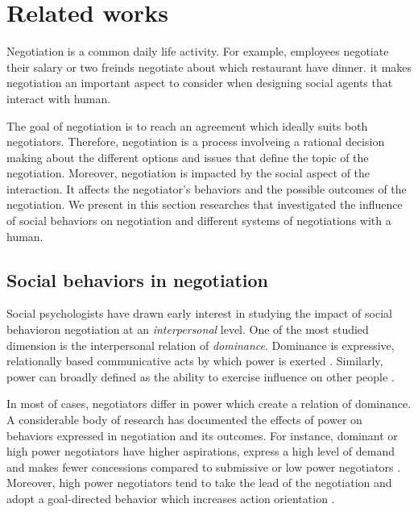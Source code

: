 \documentclass[runningheads,a4paper]{llncs}
\begin{document}
	\section{Related works}	
		Negotiation is a common daily life activity. For example, employees negotiate their salary or two freinds negotiate about which restaurant have dinner. it makes negotiation an important aspect to consider when designing social agents that interact with human.
		
		 The goal of negotiation is to reach an agreement which ideally suits both negotiators. Therefore, negotiation is a process  involveing a rational decision making about the different options and issues that define the topic of the negotiation. Moreover, negotiation is impacted by the social aspect of the interaction. It affects the negotiator's behaviors and the possible outcomes of the negotiation. We present in this section researches that investigated the influence of social behaviors on negotiation and different systems of negotiations with a human.
		
		\subsection{Social behaviors in negotiation}
			
			Social psychologists have drawn early interest in studying the impact of social behavioron negotiation at an \emph{interpersonal} level. One of the most studied dimension is the interpersonal relation of \emph{dominance}. Dominance is expressive, relationally based communicative acts by which power is exerted %
			 \cite{burgoonnonverbal}. Similarly,  
			power can broadly defined as the ability to exercise influence on other people \cite{van2006power}.
			
			In most of cases, negotiators differ in power \cite{van2006power} which create a relation of dominance. A considerable body of research has documented the effects of power on behaviors expressed in negotiation and its outcomes. For instance, dominant or high power negotiators have higher aspirations, express a high level of demand and makes fewer concessions compared to submissive or low power negotiators \cite{de1995impact}. Moreover, high power negotiators tend to take the lead of the negotiation and adopt a goal-directed behavior which increases action orientation \cite{galinsky2003power}.
			
\end{document}
